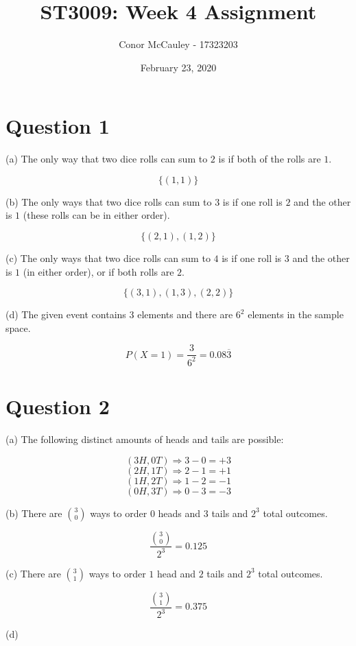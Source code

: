 \documentclass[12pt]{article}
\title{ST3009: Week 4 Assignment}
\author{Conor McCauley - 17323203}
\date{February 23, 2020}
\begin{document}
\maketitle

\section*{Question 1}

\noindent (a) The only way that two dice rolls can sum to $2$ is if both of the rolls are $1$.

$$ \{(1,1)\} $$

\noindent (b) The only ways that two dice rolls can sum to $3$ is if one roll is $2$ and the other is $1$ (these rolls can be in either order).

$$ \{(2,1),(1,2)\} $$

\noindent (c) The only ways that two dice rolls can sum to $4$ is if one roll is $3$ and the other is $1$ (in either order), or if both rolls are $2$.

$$ \{(3,1),(1,3),(2,2)\} $$

\noindent (d) The given event contains $3$ elements and there are $6^2$ elements in the sample space.

$$ P(X=1) = \frac{3}{6^2} = 0.08\overline{3}$$

\section*{Question 2}

\noindent (a) The following distinct amounts of heads and tails are possible:

$$ (3H, 0T) \Rightarrow 3 - 0 = +3 $$
$$ (2H, 1T) \Rightarrow 2 - 1 = +1 $$
$$ (1H, 2T) \Rightarrow 1 - 2 = -1 $$
$$ (0H, 3T) \Rightarrow 0 - 3 = -3 $$

\noindent (b) There are ${3 \choose 0}$ ways to order $0$ heads and $3$ tails and $2^3$ total outcomes.

$$ \frac{{3 \choose 0}}{2^3} = 0.125 $$

\noindent (c) There are ${3 \choose 1}$ ways to order $1$ head and $2$ tails and $2^3$ total outcomes.

$$ \frac{{3 \choose 1}}{2^3} = 0.375 $$

\noindent (d)

\begin{center}
\end{center}
\end{document}
